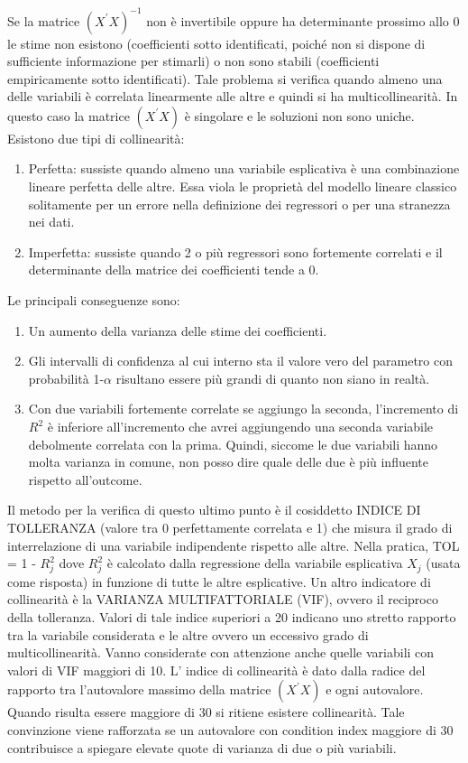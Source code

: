 \documentclass[a4page, 11pt]{article}
\begin{document}
Se la matrice $(X^{\prime} X)^{-1}$ non è invertibile oppure ha determinante prossimo allo 0 le stime non esistono (coefficienti sotto identificati, poiché non si dispone di sufficiente informazione per stimarli) o non sono stabili (coefficienti empiricamente sotto identificati).
\newline
Tale problema si verifica quando almeno una delle variabili è correlata linearmente alle altre e quindi si ha multicollinearità. In questo caso la matrice $(X^{\prime} X)$ è singolare e le soluzioni non sono uniche. 
\newline
Esistono due tipi di collinearità:
\begin{enumerate}[noitemsep]
\item Perfetta: sussiste quando almeno una variabile esplicativa è una combinazione lineare perfetta delle altre. Essa viola le proprietà del modello lineare classico solitamente per un errore nella definizione dei regressori o per una stranezza nei dati.
\item Imperfetta: sussiste quando 2 o più regressori sono fortemente correlati e il determinante della matrice dei coefficienti tende a 0.
\end{enumerate}
Le principali conseguenze sono:
\begin{enumerate}[noitemsep]
\item Un aumento della varianza delle stime dei coefficienti.
\item Gli intervalli di confidenza al cui interno sta il valore vero del parametro con probabilità 1-$\alpha$ risultano essere più grandi di quanto non siano in realtà.
\item Con due variabili fortemente correlate se aggiungo la seconda, l’incremento di $R^{2}$ è inferiore all’incremento che avrei aggiungendo una seconda variabile debolmente correlata con la prima. Quindi, siccome le due variabili hanno molta varianza in comune, non posso dire quale delle due è più influente rispetto all’outcome.
\end{enumerate}
Il metodo per la verifica di questo ultimo punto è il cosiddetto INDICE DI TOLLERANZA (valore tra 0 perfettamente correlata e 1) che misura il grado di interrelazione di una variabile indipendente rispetto alle altre. Nella pratica, TOL = 1 - $R^{2}_j$ dove $R^{2}_j$ è calcolato dalla regressione della variabile esplicativa $X_j$ (usata come risposta) in funzione di tutte le altre esplicative.
\newline
Un altro indicatore di collinearità è la VARIANZA MULTIFATTORIALE (VIF), ovvero il reciproco della tolleranza. Valori di tale indice superiori a 20 indicano uno stretto rapporto tra la variabile considerata e le altre ovvero un eccessivo grado di multicollinearità. Vanno considerate con attenzione anche quelle variabili con valori di VIF maggiori di 10.
\newline
L’ indice di collinearità è dato dalla radice del rapporto tra l’autovalore massimo della matrice $(X^{\prime}X)$ e ogni autovalore. Quando risulta essere maggiore di 30 si ritiene esistere collinearità. Tale convinzione viene rafforzata se un autovalore con condition index maggiore di 30 contribuisce a spiegare elevate quote di varianza di due o più variabili.
\end{document}

